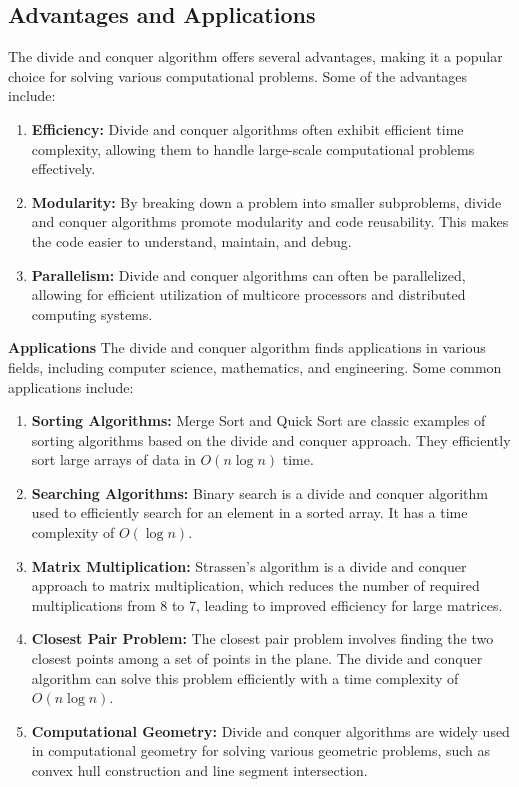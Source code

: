 \documentclass[12pt]{book} %
\begin{document}
\subsection{Advantages and Applications}

The divide and conquer algorithm offers several advantages, making it a popular choice for solving various computational problems. Some of the advantages include:

\begin{enumerate}
    \item \textbf{Efficiency:} Divide and conquer algorithms often exhibit efficient time complexity, allowing them to handle large-scale computational problems effectively.
    
    \item \textbf{Modularity:} By breaking down a problem into smaller subproblems, divide and conquer algorithms promote modularity and code reusability. This makes the code easier to understand, maintain, and debug.
    
    \item \textbf{Parallelism:} Divide and conquer algorithms can often be parallelized, allowing for efficient utilization of multicore processors and distributed computing systems.
\end{enumerate}

\textbf{Applications}
\FloatBarrier
The divide and conquer algorithm finds applications in various fields, including computer science, mathematics, and engineering. Some common applications include:

\begin{enumerate}
    \item \textbf{Sorting Algorithms:} Merge Sort and Quick Sort are classic examples of sorting algorithms based on the divide and conquer approach. They efficiently sort large arrays of data in $O(n \log n)$ time.
    
    \item \textbf{Searching Algorithms:} Binary search is a divide and conquer algorithm used to efficiently search for an element in a sorted array. It has a time complexity of $O(\log n)$.
    
    \item \textbf{Matrix Multiplication:} Strassen's algorithm is a divide and conquer approach to matrix multiplication, which reduces the number of required multiplications from 8 to 7, leading to improved efficiency for large matrices.
    
    \item \textbf{Closest Pair Problem:} The closest pair problem involves finding the two closest points among a set of points in the plane. The divide and conquer algorithm can solve this problem efficiently with a time complexity of $O(n \log n)$.
    
    \item \textbf{Computational Geometry:} Divide and conquer algorithms are widely used in computational geometry for solving various geometric problems, such as convex hull construction and line segment intersection.
\end{enumerate}
\end{document}
